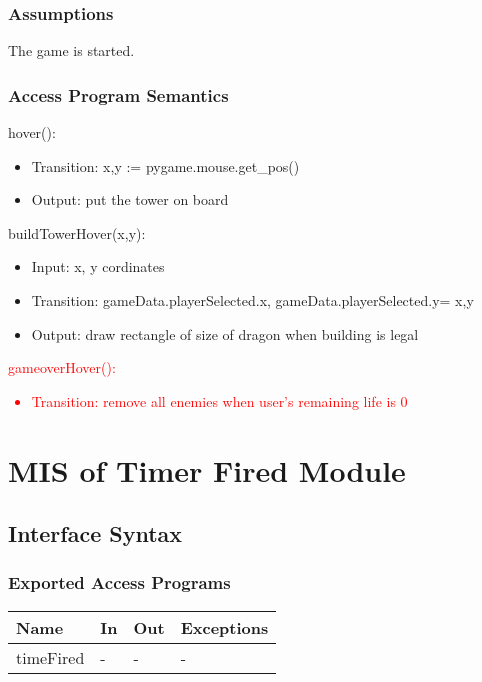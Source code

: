 \documentclass[12,english]{article}
\begin{document}
\subsubsection{Assumptions}
The game is started. 
\subsubsection{Access Program Semantics}

\noindent hover():
\begin{itemize}
    \item Transition: x,y := pygame.mouse.get\_pos()
    \item Output: put the tower on board
\end{itemize}

\noindent buildTowerHover(x,y):
\begin{itemize}
    \item Input: x, y cordinates
    \item Transition: gameData.playerSelected.x, gameData.playerSelected.y= x,y
    \item Output: draw rectangle of size of dragon when building is legal
\end{itemize}

\noindent \textcolor{red}{gameoverHover():}
\textcolor{red}{\begin{itemize}
    \item Transition: remove all enemies when user's remaining life is 0
\end{itemize}}



\section{MIS of Timer Fired Module}
\subsection{Interface Syntax}
\subsubsection{Exported Access Programs}
\begin{table}[h!]
    \centering
    \begin{tabular}{|p{4cm}|p{2cm}|p{2cm}|p{2cm}|}
    \hline
    \textbf {Name}  & {In} & {Out} & {Exceptions} \\
    \hline
    timeFired & - & - & -\\
    \hline 
    \end{tabular}
\end{table}
\end{document}
